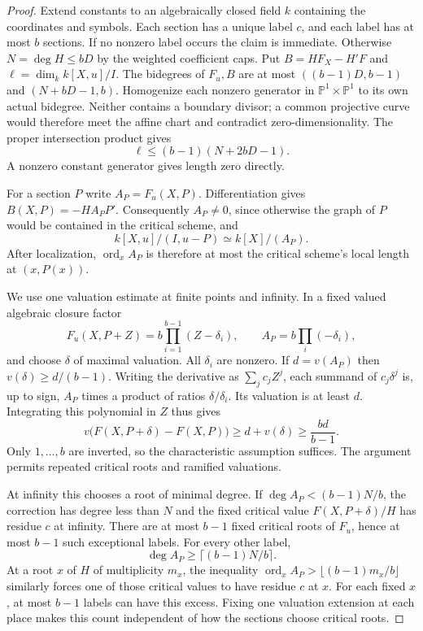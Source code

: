 \begin{proof}
Extend constants to an algebraically closed field $k$ containing the
coordinates and symbols.  Each section has a unique label $c$, and each
label has at most $b$ sections.  If no nonzero label occurs the claim is
immediate.  Otherwise $N=\deg H\le bD$ by the weighted coefficient caps.
Put $B=HF_X-H'F$ and $\ell=\dim_k k[X,u]/I$.
The bidegrees of $F_u,B$ are at most $((b-1)D,b-1)$ and
$(N+bD-1,b)$.  Homogenize each nonzero generator in
$\mathbb P^1\times\mathbb P^1$ to its own actual bidegree.  Neither
contains a boundary divisor; a common projective curve would therefore
meet the affine chart and contradict zero-dimensionality.  The proper
intersection product gives
\begin{equation}\label{eq:general-critical-length}
 \ell\le(b-1)(N+2bD-1).
\end{equation}
A nonzero constant generator gives length zero directly.

For a section $P$ write $A_P=F_u(X,P)$.  Differentiation gives
$B(X,P)=-HA_PP'$.  Consequently $A_P\ne0$, since otherwise the graph
of $P$ would be contained in the critical scheme, and
\[
 k[X,u]/(I,u-P)\simeq k[X]/(A_P).
\]
After localization, $\operatorname{ord}_x A_P$ is therefore at most the
critical scheme's local length at $(x,P(x))$.

We use one valuation estimate at finite points and infinity.  In a fixed
valued algebraic closure factor
\[
 F_u(X,P+Z)=b\prod_{i=1}^{b-1}(Z-\delta_i),
 \qquad A_P=b\prod_i(-\delta_i),
\]
and choose $\delta$ of maximal valuation.  All $\delta_i$ are nonzero.
If $d=v(A_P)$ then $v(\delta)\ge d/(b-1)$.  Writing the derivative
as $\sum_j c_jZ^j$, each summand of $c_j\delta^j$ is, up to sign,
$A_P$ times a product of ratios $\delta/\delta_i$.  Its valuation is
at least $d$.  Integrating this polynomial in $Z$ thus gives
\begin{equation}\label{eq:general-critical-correction}
 v\bigl(F(X,P+\delta)-F(X,P)\bigr)
 \ge d+v(\delta)\ge\frac{bd}{b-1}.
\end{equation}
Only $1,\ldots,b$ are inverted, so the characteristic assumption suffices.
The argument permits repeated critical roots and ramified valuations.

At infinity this chooses a root of minimal degree.  If
$\deg A_P<(b-1)N/b$, the correction has degree less than $N$ and the
fixed critical value $F(X,P+\delta)/H$ has residue $c$ at infinity.
There are at most $b-1$ fixed critical roots of $F_u$, hence at most
$b-1$ such exceptional labels.  For every other label,
\[
 \deg A_P\ge\lceil(b-1)N/b\rceil.
\]
At a root $x$ of $H$ of multiplicity $m_x$, the inequality
$\operatorname{ord}_x A_P>\lfloor(b-1)m_x/b\rfloor$ similarly forces
one of those critical values to have residue $c$ at $x$.  For each fixed
$x$, at most $b-1$ labels can have this excess.  Fixing one valuation
extension at each place makes this count independent of how the sections
choose critical roots.


\end{proof}
